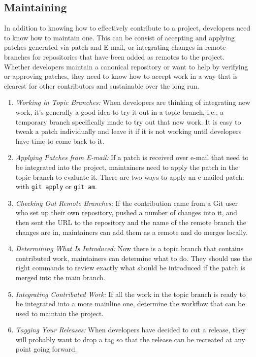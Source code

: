 \documentclass[draftclsnofoot,journal,onecolumn,12pt]{IEEEtran}
\begin{document}
\subsection{Maintaining}
In addition to knowing how to effectively contribute to a project, developers need to know how to maintain one. This can be consist of accepting and applying patches generated via patch and E-mail, or integrating changes in remote branches for repositories that have been added as remotes to the project. Whether developers maintain a canonical repository or want to help by verifying or approving patches, they need to know how to accept work in a way that is clearest for other contributors and sustainable over the long run.
\begin{enumerate}
  \item \textit{Working in Topic Branches:} When developers are thinking of integrating new work, it’s generally a good idea to try it out in a topic branch, i.e., a temporary branch specifically made to try out that new work. It is easy to tweak a patch individually and leave it if it is not working until developers have time to come back to it.
  \item \textit{Applying Patches from E-mail:} If a patch is received over e-mail that need to be integrated into the project, maintainers need to apply the patch in the topic branch to evaluate it. There are two ways to apply an e-mailed patch: with \texttt{git apply} or \texttt{git am}.
  \item \textit{Checking Out Remote Branches:} If the contribution came from a Git user who set up their own repository, pushed a number of changes into it, and then sent the URL to the repository and the name of the remote branch the changes are in, maintainers can add them as a remote and do merges locally.
  \item \textit{Determining What Is Introduced:} Now there is a topic branch that contains contributed work, maintainers can determine what to do. They should use the right commands to review exactly what should be introduced if the patch is merged into the main branch.
  \item \textit{Integrating Contributed Work:} If all the work in the topic branch is ready to be integrated into a more mainline one, determine the workflow that can be used to maintain the project.
  \item \textit{Tagging Your Releases:} When developers have decided to cut a release, they will probably want to drop a tag so that the release can be recreated at any point going forward.

\end{enumerate}
\end{document}
